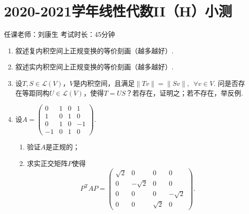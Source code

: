 \section{2020-2021学年线性代数II（H）小测}

\begin{center}
    任课老师：刘康生\hspace{4em} 考试时长：45分钟
\end{center}

\begin{enumerate}
    \item 叙述复内积空间上正规变换的等价刻画（越多越好）.

    \item 叙述实内积空间上正规变换的等价刻画（越多越好）.

    \item 设$T,S\in\mathcal{L}(V)$，$V$是内积空间，且满足$\lVert Tv \rVert=\lVert Sv \rVert,\enspace \forall v\in V$. 问是否存在等距同构$U\in\mathcal{L}(V)$，使得$T=US$？若存在，证明之；若不存在，举反例.

    \item 设$A=\begin{pmatrix}
           0 & 1 & 0 & 1 \\ 1 & 0 & 1 & 0 \\ 0 & 1 & 0 & -1 \\ -1 & 0 & 1 & 0
    \end{pmatrix}$.
    \begin{enumerate}
        \item 验证$A$是正规的；

        \item 求实正交矩阵$P$使得
        \[P^{\mathrm{T}}AP=\begin{pmatrix}
            \sqrt{2} & 0 & 0 & 0 \\ 0 & -\sqrt{2} & 0 & 0 \\ 0 & 0 & 0 & -\sqrt{2} \\ 0 & 0 & \sqrt{2} & 0
        \end{pmatrix}.\]
    \end{enumerate}
\end{enumerate}

\clearpage
